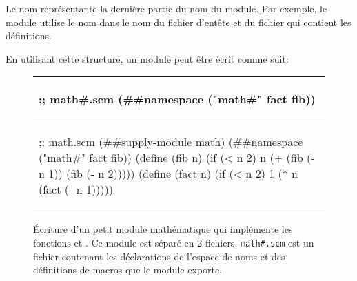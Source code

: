 Le nom  représentante la dernière partie du nom du module. Par
exemple, le module  utilise le nom  dans le
nom du fichier d'entête et du fichier qui contient les définitions.


En utilisant cette structure, un module peut être écrit comme suit:

\begin{center}
  \begin{figure}[h]
  \begin{tabular}{|l|}
\hline
\begin{mplisting}{0.5}
;; math#.scm
(##namespace ("math#" fact fib))
\end{mplisting} \\\hline
\begin{mplisting}{0.6}
;; math.scm
(##supply-module math)
(##namespace ("math#" fact fib))
(define (fib n)
  (if (< n 2)
    n
    (+ (fib (- n 1)) (fib (- n 2)))))
(define (fact n)
  (if (< n 2)
    1
    (* n (fact (- n 1)))))
\end{mplisting}\\\hline
  \end{tabular}
  \caption{Écriture d'un petit module mathématique qui implémente les fonctions 
    et . Ce module est séparé en 2 fichiers, \texttt{math\#.scm} est un fichier
    contenant les déclarations de l'espace de noms et des définitions de macros que le module
    exporte.}
  \label{fig:math_module1}
\end{figure}
\end{center}

%

